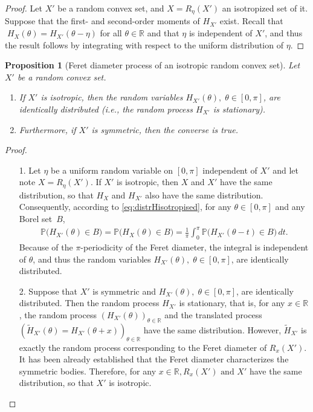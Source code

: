 \documentclass[numbers,compress,v1.0.1]{vmsta}
\newtheorem{proposition}{Proposition}
\theoremstyle{definition}
\begin{document}
\begin{proof}
Let $X'$ be a random convex set, and $X=R_\eta(X')$ an isotropized set
of it. Suppose that the first- and second-order moments of $H_{X'}$
exist. Recall that $\;H_{X}(\theta)= H_{X'}(\theta-\eta)$ for all
$\theta\in\mathbb{R}$ and that $\eta$ is independent of $X'$, and thus
the result follows by integrating with respect to the uniform
distribution of $\eta$.
\end{proof}

\begin{proposition}[Feret diameter process of an isotropic random convex set]
Let $X'$ be a random convex set.
%
\begin{enumerate}
%
\item If $X'$ is isotropic, then the random variables $H_{X'}(\theta
),\; \theta\in[0,\pi]$, are identically distributed \textup{(}i.e.,
the random process $H_{X'}$ is stationary\textup{)}.
%
\item Furthermore, if $X'$ is symmetric, then the converse is true.
\end{enumerate}
%
\label{prop:isotropFeret}
\end{proposition}

\begin{proof}
$\:$
%
\begin{enumerate}
%
\item[1.] Let $\eta$ be a uniform random variable on $[0,\pi]$
independent of $X'$ and let note $X=R_\eta(X')$. If $X'$ is isotropic,
then $X$ and $X'$ have the same distribution, so that $H_X$ and
$H_{X'}$ also have the same distribution. Consequently, according to
\eqref{eq:distrHisotropised}, for any $\theta\in[0,\pi]$ and any Borel
set~$B$,
%
\begin{align*}
\mathbb{P}\bigl( H_{X'}(\theta)\in B\bigr)=\mathbb{P}\bigl(
H_{X}(\theta)\in B\bigr)=\frac
{1}{\pi}\int_0^{\pi}
\mathbb{P}\bigl(H_{X'}(\theta-t)\in B\bigr)\,dt.
\end{align*}
%
Because of the $\pi$-periodicity of the Feret diameter, the integral is
independent of $\theta$, and thus the random variables $H_{X'}(\theta
),\; \theta\in[0,\pi]$, are identically distributed.
%
\item[2.] Suppose that $X'$ is symmetric and $H_{X'}(\theta),\; \theta
\in[0,\pi]$, are identically distributed. Then the random process $
H_{X'}$ is stationary, that is, for any $x\in\mathbb{R}$, the random
process $(H_{X'}(\theta))_ {\theta\in\mathbb{R}}$ and the translated
process $(\tilde{H}_{X'}(\theta)=H_{X'}(\theta+x))_ {\theta\in\mathbb
{R}}$ have the same distribution. However, $\tilde{H}_{X'}$ is exactly
the random process corresponding to the Feret diameter of $R_x(X')$. It
has been already established that the Feret diameter characterizes the
symmetric bodies. Therefore, for any $x\in\mathbb{R},R_x(X')\text{ and } X'$
have the same distribution, so that $X'$ is isotropic.\qedhere
\end{enumerate}
\end{proof}
\end{document}

